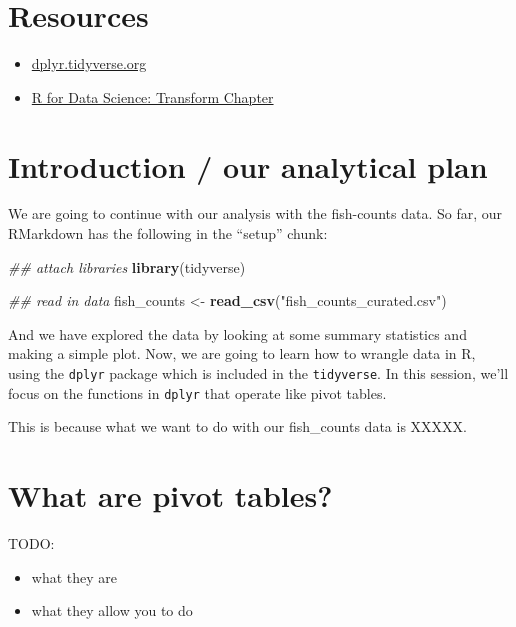 \documentclass[]{book}
\newenvironment{Shaded}{\begin{snugshade}}{\end{snugshade}}
\newcommand{\CommentTok}[1]{\textcolor[rgb]{0.56,0.35,0.01}{\textit{#1}}}
\newcommand{\KeywordTok}[1]{\textcolor[rgb]{0.13,0.29,0.53}{\textbf{#1}}}
\newcommand{\NormalTok}[1]{#1}
\newcommand{\StringTok}[1]{\textcolor[rgb]{0.31,0.60,0.02}{#1}}
\providecommand{\tightlist}{%
  \setlength{\itemsep}{0pt}\setlength{\parskip}{0pt}}
\begin{document}
\hypertarget{resources-3}{%
\section{Resources}\label{resources-3}}

\begin{itemize}
\tightlist
\item
  \href{https://dplyr.tidyverse.org/}{dplyr.tidyverse.org}
\item
  \href{https://r4ds.had.co.nz/transform.html}{R for Data Science: Transform Chapter}
\end{itemize}

\hypertarget{introduction-our-analytical-plan}{%
\section{Introduction / our analytical plan}\label{introduction-our-analytical-plan}}

We are going to continue with our analysis with the fish-counts data. So far, our RMarkdown has the following in the ``setup'' chunk:

\begin{Shaded}
\begin{Highlighting}[]
\CommentTok{## attach libraries}
\KeywordTok{library}\NormalTok{(tidyverse)}

\CommentTok{## read in data}
\NormalTok{fish_counts <-}\StringTok{ }\KeywordTok{read_csv}\NormalTok{(}\StringTok{"fish_counts_curated.csv"}\NormalTok{)}
\end{Highlighting}
\end{Shaded}

And we have explored the data by looking at some summary statistics and making a simple plot. Now, we are going to learn how to wrangle data in R, using the \texttt{dplyr} package which is included in the \texttt{tidyverse}. In this session, we'll focus on the functions in \texttt{dplyr} that operate like pivot tables.

This is because what we want to do with our fish\_counts data is XXXXX.

\hypertarget{what-are-pivot-tables}{%
\section{What are pivot tables?}\label{what-are-pivot-tables}}

TODO:

\begin{itemize}
\tightlist
\item
  what they are
\item
  what they allow you to do
\end{itemize}
\end{document}
